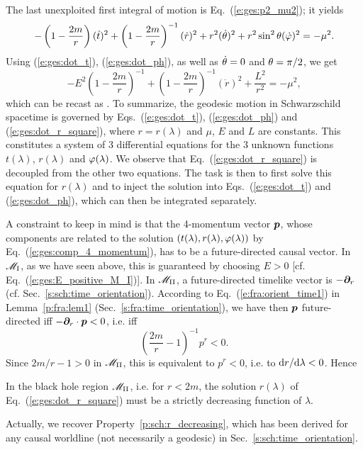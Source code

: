The last unexploited first integral of motion is Eq.~(\ref{e:ges:p2_mu2}); it
yields
\[
   - \left( 1 - \frac{2m}{r} \right) (\dot{t})^2 +
   \left( 1 - \frac{2m}{r} \right) ^{-1}  (\dot{r})^2
   + r^2 (\dot{\theta})^2 + r^2 \sin^2\theta (\dot{\varphi})^2  = - \mu^2 .
\]
Using (\ref{e:ges:dot_t}), (\ref{e:ges:dot_ph}), as well as
$\dot{\theta}=0$ and $\theta=\pi/2$, we get
\[
    -  E^2 \left(1 - \frac{2m}{r} \right) ^{-1}
    +  \left( 1 - \frac{2m}{r} \right) ^{-1}  (\dot{r})^2
    +  \frac{L^2}{r^2} = - \mu^2 ,
\]
which can be recast as
\be \label{e:ges:dot_r_square}
     .
\ee
To summarize, the geodesic motion in Schwarzschild spacetime is governed by
Eqs.~(\ref{e:ges:dot_t}), (\ref{e:ges:dot_ph}) and (\ref{e:ges:dot_r_square}),
where $r=r(\lambda)$ and $\mu$, $E$ and $L$ are constants.
This constitutes a system of 3 differential equations for the 3 unknown
functions $t(\lambda)$, $r(\lambda)$ and $\varphi(\lambda)$.
We observe
that Eq.~(\ref{e:ges:dot_r_square}) is decoupled from the other two equations.
The task is then to first solve this equation for $r(\lambda)$ and to inject
the solution into Eqs.~(\ref{e:ges:dot_t}) and (\ref{e:ges:dot_ph}), which
can then be integrated separately.

A constraint to keep in mind is that the 4-momentum vector $\bm{p}$, whose
components are related to the solution $(t(\lambda), r(\lambda), \varphi(\lambda))$
by Eq.~(\ref{e:ges:comp_4_momentum}), has to be a future-directed causal vector.
In $\mathscr{M}_{\rm I}$, as we have seen above, this is guaranteed by choosing $E > 0$
[cf. Eq.~(\ref{e:ges:E_positive_M_I})]. In $\mathscr{M}_{\rm II}$, a future-directed
timelike vector is $-\bm{\partial}_r$ (cf. Sec.~\ref{s:sch:time_orientation}).
According to Eq.~(\ref{e:fra:orient_time1}) in Lemma~\ref{p:fra:lem1} (Sec.~\ref{s:fra:time_orientation}),
we have then
$\bm{p}$ future-directed iff $-\bm{\partial}_r\cdot\bm{p} < 0$, i.e. iff
\[
    \left(\frac{2m}{r} - 1  \right) ^{-1} p^r < 0  .
\]
Since $2m/r - 1 > 0$ in $\mathscr{M}_{\rm II}$, this is equivalent to $p^r < 0$, i.e.
to $\mathrm{d} r/\mathrm{d}\lambda < 0$. Hence
\begin{prop}
In the black hole region $\mathscr{M}_{\rm II}$, i.e. for $r<2m$,
the solution $r(\lambda)$ of Eq.~(\ref{e:ges:dot_r_square})
must be a strictly decreasing function of $\lambda$.
\end{prop}
Actually, we recover Property~\ref{p:sch:r_decreasing}, which has been
derived for any causal worldline (not necessarily
a geodesic) in Sec.~\ref{s:sch:time_orientation}.

